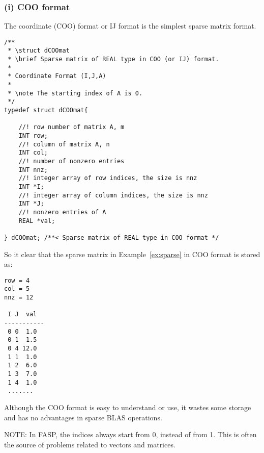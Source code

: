 \documentclass[11pt]{memoir}
\begin{document}
\subsubsection*{(i) COO format}

The coordinate (COO) format or IJ format is the simplest sparse matrix format.
\begin{lstlisting}
/**
 * \struct dCOOmat
 * \brief Sparse matrix of REAL type in COO (or IJ) format.
 *
 * Coordinate Format (I,J,A)
 *
 * \note The starting index of A is 0.
 */
typedef struct dCOOmat{
	
	//! row number of matrix A, m
	INT row;
	//! column of matrix A, n
	INT col;
	//! number of nonzero entries
	INT nnz;
	//! integer array of row indices, the size is nnz
	INT *I;
	//! integer array of column indices, the size is nnz
	INT *J;
	//! nonzero entries of A
	REAL *val;
	
} dCOOmat; /**< Sparse matrix of REAL type in COO format */
\end{lstlisting}
%
So it clear that the sparse matrix in Example~\ref{ex:sparse} in COO format is stored as:
%
\begin{lstlisting}[numbers=none]
row = 4
col = 5
nnz = 12

 I J  val
-----------
 0 0  1.0
 0 1  1.5
 0 4 12.0
 1 1  1.0
 1 2  6.0
 1 3  7.0
 1 4  1.0
 .......
\end{lstlisting}
%
Although the COO format is easy to understand or use, it wastes some storage and has no advantages in sparse BLAS operations.

\begin{snugshade}\noindent
NOTE: In FASP, the indices always start from 0, instead of from 1. This is often the source of problems related to vectors and matrices.
\end{snugshade}
\end{document}
